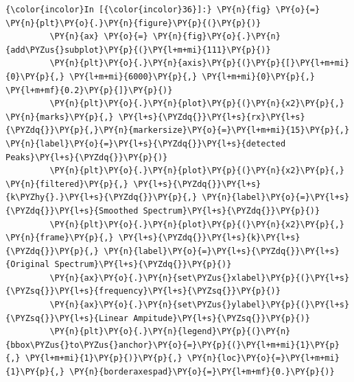     \begin{Verbatim}[commandchars=\\\{\}]
{\color{incolor}In [{\color{incolor}36}]:} \PY{n}{fig} \PY{o}{=} \PY{n}{plt}\PY{o}{.}\PY{n}{figure}\PY{p}{(}\PY{p}{)}
         \PY{n}{ax} \PY{o}{=} \PY{n}{fig}\PY{o}{.}\PY{n}{add\PYZus{}subplot}\PY{p}{(}\PY{l+m+mi}{111}\PY{p}{)}
         \PY{n}{plt}\PY{o}{.}\PY{n}{axis}\PY{p}{(}\PY{p}{[}\PY{l+m+mi}{0}\PY{p}{,} \PY{l+m+mi}{6000}\PY{p}{,} \PY{l+m+mi}{0}\PY{p}{,} \PY{l+m+mf}{0.2}\PY{p}{]}\PY{p}{)}
         \PY{n}{plt}\PY{o}{.}\PY{n}{plot}\PY{p}{(}\PY{n}{x2}\PY{p}{,} \PY{n}{marks}\PY{p}{,} \PY{l+s}{\PYZdq{}}\PY{l+s}{rx}\PY{l+s}{\PYZdq{}}\PY{p}{,}\PY{n}{markersize}\PY{o}{=}\PY{l+m+mi}{15}\PY{p}{,} \PY{n}{label}\PY{o}{=}\PY{l+s}{\PYZdq{}}\PY{l+s}{detected Peaks}\PY{l+s}{\PYZdq{}}\PY{p}{)}
         \PY{n}{plt}\PY{o}{.}\PY{n}{plot}\PY{p}{(}\PY{n}{x2}\PY{p}{,} \PY{n}{filtered}\PY{p}{,} \PY{l+s}{\PYZdq{}}\PY{l+s}{k\PYZhy{}.}\PY{l+s}{\PYZdq{}}\PY{p}{,} \PY{n}{label}\PY{o}{=}\PY{l+s}{\PYZdq{}}\PY{l+s}{Smoothed Spectrum}\PY{l+s}{\PYZdq{}}\PY{p}{)}
         \PY{n}{plt}\PY{o}{.}\PY{n}{plot}\PY{p}{(}\PY{n}{x2}\PY{p}{,} \PY{n}{frame}\PY{p}{,} \PY{l+s}{\PYZdq{}}\PY{l+s}{k}\PY{l+s}{\PYZdq{}}\PY{p}{,} \PY{n}{label}\PY{o}{=}\PY{l+s}{\PYZdq{}}\PY{l+s}{Original Spectrum}\PY{l+s}{\PYZdq{}}\PY{p}{)}
         \PY{n}{ax}\PY{o}{.}\PY{n}{set\PYZus{}xlabel}\PY{p}{(}\PY{l+s}{\PYZsq{}}\PY{l+s}{frequency}\PY{l+s}{\PYZsq{}}\PY{p}{)}
         \PY{n}{ax}\PY{o}{.}\PY{n}{set\PYZus{}ylabel}\PY{p}{(}\PY{l+s}{\PYZsq{}}\PY{l+s}{Linear Ampitude}\PY{l+s}{\PYZsq{}}\PY{p}{)}
         \PY{n}{plt}\PY{o}{.}\PY{n}{legend}\PY{p}{(}\PY{n}{bbox\PYZus{}to\PYZus{}anchor}\PY{o}{=}\PY{p}{(}\PY{l+m+mi}{1}\PY{p}{,} \PY{l+m+mi}{1}\PY{p}{)}\PY{p}{,} \PY{n}{loc}\PY{o}{=}\PY{l+m+mi}{1}\PY{p}{,} \PY{n}{borderaxespad}\PY{o}{=}\PY{l+m+mf}{0.}\PY{p}{)}
\end{Verbatim}



